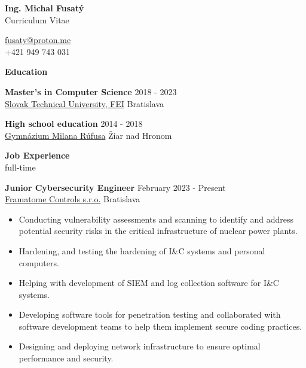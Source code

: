 \documentclass[12pt]{article}
\begin{document}
\begingroup
{}
\begin{center}
	{\Large \bfseries Ing. Michal Fusatý} \\ 
	{\large Curriculum Vitae} 	
\end{center}
\endgroup


\begin{center}
	\noindent
	\href{mailto:fusaty@proton.me}{fusaty@proton.me} \\ 
	+421 949 743 031 \\
\end{center}
	\noindent

\begin{center}
	{\noindent \bfseries Education}
\end{center} 

\noindent
{\bfseries Master's in Computer Science} \hfill 2018 - 2023\\ 
\noindent \href{https://www.fei.stuba.sk/english.html?page_id=793}{Slovak Technical University, FEI} \hfill Bratislava
\noindent

\vspace{0.1in}

\noindent
{\bfseries High school education} \hfill 2014 - 2018\\ 
\noindent \href{https://gymziar.edupage.org/}{Gymnázium Milana Rúfusa}  \hfill Žiar nad Hronom
\noindent


\vspace{0.2in} %

\begin{center}
	{\noindent \bfseries Job Experience} \\
	{full-time}
\end{center}

\noindent
{\bfseries Junior Cybersecurity Engineer} \hfill February 2023 - Present \\  
\noindent \href{https://www.framatome.com/en/about/}{Framatome Controls s.r.o.} \hfill Bratislava
\begin{itemize} \itemsep -2pt %
\item Conducting vulnerability assessments and scanning to identify and address potential security risks in the critical infrastructure of nuclear power plants.
\item Hardening, and testing the hardening of I\&C systems and personal computers.
\item Helping with development of SIEM and log collection software for I\&C systems.
\item Developing software tools for penetration testing and collaborated with software development teams to help them implement secure coding practices.
\item Designing and deploying network infrastructure to ensure optimal performance and security.
\end{itemize}
\end{document}
